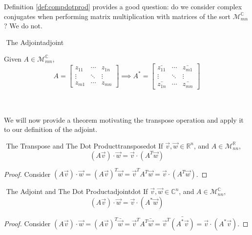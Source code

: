         \vphantom
        \\
        \\
        Definition \ref{def:compdotprod} provides a good question: do we consider complex conjugates when performing matrix multiplication with matrices of the sort \(\mathcal{M}_{mn}^\mathbb{C}\)? We do not.
        \begin{definition}{\Stop\,\,The Adjoint}{adjoint}

            Given \(A\in\mathcal{M}_{mn}^\mathbb{C}\), 
            \begin{equation*}
                A=\begin{bmatrix}
                    z_{11} & \cdots & z_{1n} \\
                    \vdots & \ddots & \vdots \\
                    z_{m1} & \cdots & z_{mn}
                \end{bmatrix}
                \implies 
                A^*=\begin{bmatrix}
                    \bar{z_{11}} & \cdots & \bar{z_{m1}} \\
                    \vdots & \ddots & \vdots \\
                    \bar{z_{1n}} & \cdots & \bar{z_{mn}}
                \end{bmatrix}
            \end{equation*}

        \end{definition}
        \pagebreak
        \vphantom
        \\
        \\
        We will now provide a theorem motivating the transpose operation and apply it to our definition of the adjoint.
        \begin{theorem}{\Stop\,\,The Transpose and The Dot Product}{transposedot}
            If \(\vec{v},\vec{w}\in\mathbb{R}^n\), and \(A\in\mathcal{M}_{nn}^\mathbb{R}\), 
            \begin{equation*}
                (A\vec{v})\cdot\vec{w}=\vec{v}\cdot(A^T\vec{w})
            \end{equation*}
            \begin{proof}
                Consider \((A\vec{v})\cdot\vec{w}=(A\vec{v})^T\vec{w}=\vec{v}^T A^T\vec{w}=\vec{v}\cdot (A^T\vec{w})\).
            \end{proof}
        \end{theorem}
        \begin{theorem}{\Stop\,\,The Adjoint and The Dot Product}{adjointdot}
            If \(\vec{v},\vec{w}\in\mathbb{C}^n\), and \(A\in\mathcal{M}_{nn}^\mathbb{C}\), 
            \begin{equation*}
                (A\vec{v})\cdot\vec{w}=\vec{v}\cdot(A^*\vec{w})
            \end{equation*}
            \begin{proof}
                Consider \((A\vec{v})\cdot\vec{w}=(A\vec{v})^T\bar{\vec{w}}=\vec{v}^TA^T\bar{\vec{w}}=\vec{v}^T\bar{(A^*\vec{v})}=\vec{v}\cdot(A^*\vec{v})\).
            \end{proof}
        \end{theorem}
